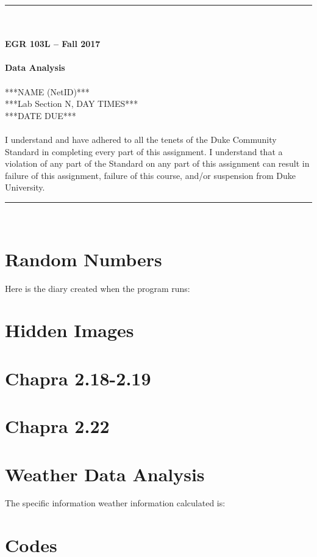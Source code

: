 \documentclass{article}
\begin{document}
\begin{center}
\rule{6.5in}{0.5mm}\\~\\
\textbf{\large EGR 103L -- Fall 2017}\\~\\
\textbf{\huge Data Analysis}\\~\\
***NAME (NetID)***\\
***Lab Section N, DAY TIMES***\\
***DATE DUE***\\~\\
{\small I understand and have adhered to all the tenets of the Duke
  Community Standard in completing every part of this assignment.  I
  understand that a violation of any part of the Standard on any part
  of this assignment can result in failure of this assignment, failure
  of this course, and/or suspension from Duke University.} 
\rule{6.5in}{0.5mm}\\
\end{center}
\tableofcontents
\listoffigures
\pagebreak

\section{Random Numbers}
Here is the diary created when the program runs:

\section{Hidden Images}

\section{Chapra 2.18-2.19}

\section{Chapra 2.22}

\section{Weather Data Analysis}
The specific information weather information calculated is:

\pagebreak
\appendix
\section{Codes}
\end{document}
